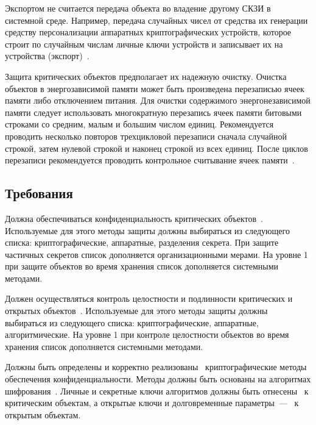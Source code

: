 Экспортом не считается передача объекта во владение другому СКЗИ в системной
среде.
%
Например, передача случайных чисел от средства их генерации средству
персонализации аппаратных криптографических устройств, которое строит по 
случайным числам личные ключи устройств и записывает их на устройства
(экспорт)~. 

Защита критических объектов предполагает их надежную очистку.
%
Очистка объектов в энергозависимой памяти может быть произведена перезаписью 
ячеек памяти либо отключением питания.
%
Для очистки содержимого энергонезависимой памяти следует использовать
многократную перезапись ячеек памяти битовыми строками со средним, малым и 
большим числом единиц. Рекомендуется проводить несколько повторов трехцикловой 
перезаписи сначала случайной строкой, затем нулевой строкой и 
наконец строкой из всех единиц. 
%
После циклов перезаписи рекомендуется проводить контрольное считывание ячеек 
памяти~.

\subsection{Требования}\label{DP.Reqs}

\label{R.DP.Crit} %
Должна обеспечиваться конфиденциальность критических объектов~.
%
Используемые для этого методы защиты должны выбираться из следующего списка:
криптографические, аппаратные, разделения секрета.
%
При защите частичных секретов список дополняется организационными мерами.
%
На уровне 1 при защите объектов во время хранения список дополняется системными 
методами. 

\label{R.DP.Public} %
Должен осуществляться контроль целостности и подлинности критических и открытых
объектов~. 
%
Используемые для этого методы защиты должны выбираться из следующего списка: 
криптографические, аппаратные, алгоритмические.
%
На уровне 1 при контроле целостности объектов во время хранения список 
дополняется системными методами.

\label{R.DP.CryptoE} %
Должны быть определены и корректно 
реализованы~ 
криптографические методы обеспечения конфиденциальности.
%
Методы должны быть основаны на алгоритмах шифрования~.
%
Личные и секретные ключи алгоритмов должны быть 
отнесены~ к критическим объектам, а открытые 
ключи и долговременные параметры~--- ~к открытым объектам. 

